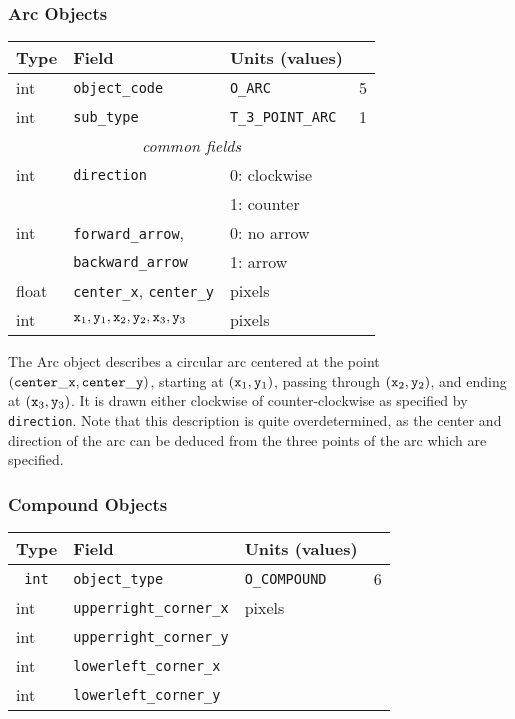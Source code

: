 \subsubsection{Arc Objects}
%
\begin{center}
\begin{tabular} {|l|l|ll|}
\hline
Type	& Field			& Units (values)	&	\\ \hline
\hline
%
int	& {\tt object\_code}	& {\tt O\_ARC}		& 5	\\ \hline
%
int	& {\tt sub\_type}	& {\tt T\_3\_POINT\_ARC}& 1	\\ \hline
%
\multicolumn{4}{c}{\it common fields}				\\ \hline
%
int	& {\tt direction}	& 0: clockwise		&	\\
	&			& 1: counter		&	\\ \hline
%
int	& {\tt forward\_arrow},	& 0: no arrow		&	\\
	& {\tt backward\_arrow}	& 1: arrow		&	\\ \hline
%
float	& {\tt center\_x},
	  {\tt center\_y}	& pixels		&	\\ \hline
%
int	& ${\tt x}_1, {\tt y}_1,
	   {\tt x}_2, {\tt y}_2,
	   {\tt x}_3, {\tt y}_3$& pixels		&	\\ \hline
\end{tabular}
\end{center}
%
The Arc object describes a circular arc centered at the point
	\linebreak $({\tt center\_x}, {\tt center\_y})$, starting at
	$({\tt x}_1, {\tt y}_1)$, passing through $({\tt x}_2, {\tt y}_2)$,
	and ending at $({\tt x}_3, {\tt y}_3)$.
It is drawn either clockwise of counter-clockwise as specified by
	{\tt direction}.
Note that this description is quite overdetermined, as the center and
	direction of the arc can be deduced from the three points
	of the arc which are specified.

\subsubsection{Compound Objects}

\begin{center}
\begin{tabular}{|l|l|ll|}
\hline
Type	& Field			& Units (values)		&	\\ \hline
\hline
\tt
int	& {\tt object\_type}	& {\tt O\_COMPOUND}		& 6	\\ \hline
%
int	& {\tt upperright\_corner\_x}	& pixels		&	\\
int	& {\tt upperright\_corner\_y}	&			&	\\
int	& {\tt lowerleft\_corner\_x}	&			&	\\
int	& {\tt lowerleft\_corner\_y}	&			&	\\ \hline
\end{tabular}
\end{center}

